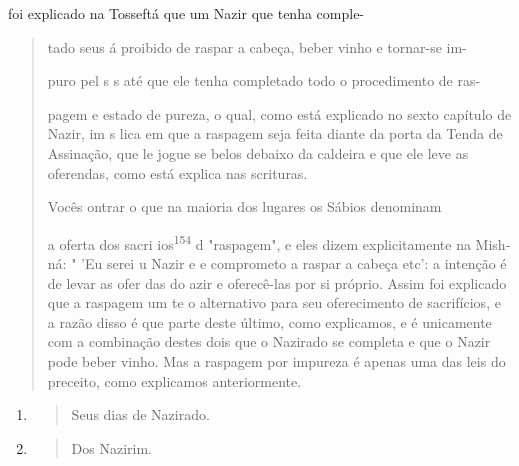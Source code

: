 foi explicado na Tosseftá que um Nazir que tenha comple-

\begin{quote}
tado seus á proibido de raspar a cabeça, beber vinho e tornar-se im-

puro pel s s até que ele tenha completado todo o procedimento de ras-

pagem e estado de pureza, o qual, como está explicado no sexto capítulo
de Nazir, im s lica em que a raspagem seja feita diante da porta da
Tenda de Assina­ção, que le jogue se belos debaixo da caldeira e que ele
leve as oferendas, como está explica nas scrituras.

Vocês ontrar o que na maioria dos lugares os Sábios denominam

a oferta dos sacri ios\textsuperscript{154} d "raspagem", e eles dizem
explicitamente na Mish­ná: " 'Eu serei u Nazir e e comprometo a raspar a
cabeça etc': a intenção é de levar as ofer das do azir e oferecê-las por
si próprio. Assim foi explica­do que a raspagem um te o alternativo para
seu oferecimento de sacrifícios, e a razão disso é que parte deste
último, como explicamos, e é unicamente com a combinação destes dois que
o Nazirado se completa e que o Nazir pode beber vinho. Mas a raspagem
por impureza é apenas uma das leis do preceito, como explicamos
anteriormente.
\end{quote}

\begin{enumerate}
\def\labelenumi{\arabic{enumi}.}
\setcounter{enumi}{152}
\item
  \begin{quote}
  Seus dias de Nazirado.
  \end{quote}
\item
  \begin{quote}
  Dos Nazirim.
  \end{quote}
\end{enumerate}

